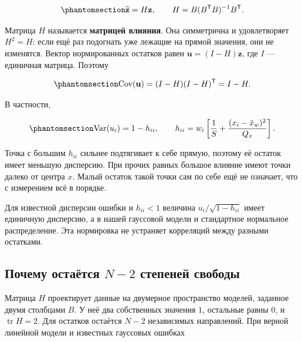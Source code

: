 \documentclass[
  russian,
  11pt,
  a4paper,
  open=any]{scrbook}
\begin{document}
\begin{equation}\protect\phantomsection\label{eq-ch11-hat-matrix}{
\widehat{\mathbf z}=H\mathbf z,
\qquad
H=B(B^{\mathsf T}B)^{-1}B^{\mathsf T}.
}\end{equation}

Матрица \(H\) называется \textbf{матрицей влияния}. Она симметрична и
удовлетворяет \(H^2=H\): если ещё раз подогнать уже лежащие на прямой
значения, они не изменятся. Вектор нормированных остатков равен
\(\mathbf u=(I-H)\mathbf z\), где \(I\) --- единичная матрица. Поэтому

\begin{equation}\protect\phantomsection\label{eq-ch11-residual-covariance}{
\operatorname{Cov}(\mathbf u)
=(I-H)(I-H)^{\mathsf T}=I-H.
}\end{equation}

В частности,

\begin{equation}\protect\phantomsection\label{eq-ch11-leverage}{
\operatorname{Var}(u_i)=1-h_{ii},
\qquad
h_{ii}=w_i\left[\frac1S+\frac{(x_i-\bar x_w)^2}{Q_x}\right].
}\end{equation}

Точка с большим \(h_{ii}\) сильнее подтягивает к себе прямую, поэтому её
остаток имеет меньшую дисперсию. При прочих равных большое влияние имеют
точки далеко от центра \(x\). Малый остаток такой точки сам по себе ещё
не означает, что с измерением всё в порядке.

Для известной дисперсии ошибки и \(h_{ii}<1\) величина
\(u_i/\sqrt{1-h_{ii}}\) имеет единичную дисперсию, а в нашей гауссовой
модели и стандартное нормальное распределение. Эта нормировка не
устраняет корреляций между разными остатками.

\subsection{\texorpdfstring{Почему остаётся \(N-2\) степеней
свободы}{Почему остаётся N-2 степеней свободы}}\label{ux43fux43eux447ux435ux43cux443-ux43eux441ux442ux430ux451ux442ux441ux44f-n-2-ux441ux442ux435ux43fux435ux43dux435ux439-ux441ux432ux43eux431ux43eux434ux44b}

Матрица \(H\) проектирует данные на двумерное пространство моделей,
заданное двумя столбцами \(B\). У неё два собственных значения \(1\),
остальные равны \(0\), и \(\operatorname{tr}H=2\). Для остатков остаётся
\(N-2\) независимых направлений. При верной линейной модели и известных
гауссовых ошибках
\end{document}
